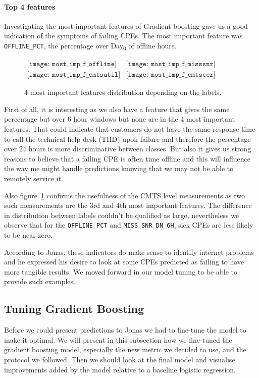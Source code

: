 \paragraph{Top 4 features}
Investigating the most important features of Gradient boosting gave us a good indication of the symptoms of failing CPEs. The most important feature was \texttt{OFFLINE\_PCT}, the percentage over Day\textsubscript{0} of offline hours. 


\begin{figure}[h]
\begin{center}$
\begin{array}{cc}
\texttt{[image: most\_imp\_f\_offline]} &
\texttt{[image: most\_imp\_f\_misssnr]} \\
\texttt{[image: most\_imp\_f\_cmtsutil]} &
\texttt{[image: most\_imp\_f\_cmtscer]}
\end{array}$
\end{center}
\caption{\label{most_important} 4 most important features distribution depending on the labels.}
\end{figure}


First of all, it is interesting as we also have a feature that gives the same percentage but over 6 hour windows but none are in the 4 most important features. That could indicate that customers do not have the same response time to call the technical help desk (THD) upon failure and therefore the percentage over 24 hours is more discriminative between classes. But also it gives us strong reasons to believe that a failing CPE is often time offline and this will influence the way me might handle predictions knowing that we may not be able to remotely service it. 

Also figure~\ref{most_important} confirms the usefulness of the CMTS level measurements as two such measurements are the 3rd and 4th most important features. The difference in distribution between labels couldn't be qualified as large, nevertheless we observe that for the \texttt{OFFLINE\_PCT} and \texttt{MISS\_SNR\_DN\_6H}, sick CPEs are less likely to be near zero.

According to Jonas, these indicators do make sense to identify internet problems and he expressed his desire to look at some CPEs predicted as failing to have more tangible results. We moved forward in our model tuning to be able to provide such examples. 

\subsection{Tuning Gradient Boosting}
Before we could present predictions to Jonas we had to fine-tune the model to make it optimal. We will present in this subsection how we fine-tuned the gradient boosting model, especially the new metric we decided to use, and the protocol we followed. Then we should look at the final model and visualise improvements added by the model relative to a baseline logistic regression.

